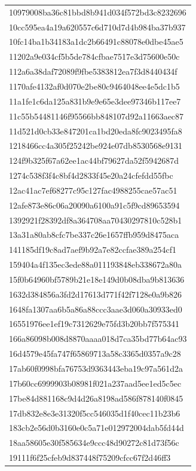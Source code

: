 \begin{tabular}{l}
10979008ba36c81bbd8b941d034f572bd3c8232696 \\
10cc595ea4a19a620557c6d710d7d4b984ba37b937 \\
10fc14ba1b34183a1dc2b66491c88078e0dbe45ae5 \\
11202a9e034cf5b5de784cfbae7517e3d75600e50c \\
112a6a38daf72089f9fbe5383812ea7f3d8440434f \\
1170afe4132af0d070e2be80c9464048ee4e5dc1b5 \\
11a1fe1c6da125a831b9e9e65e3dee97346b117ee7 \\
11c55b54481146f95566bb848107d92a11663aec87 \\
11d521d0cb33e847201ca1bd20eda8fc9023495fa8 \\
1218466cc4a305f25242be924e07db8530568e9131 \\
124f9b325f67a62ee1ac44bf79627da52f5942687d \\
1274c538f3f4c8bf4d2833f45e20a24cfefdd55fbc \\
12ac41ac7ef68277c95c127fac4988255cae57ac51 \\
12afe873e86c06a20090a6100a91c5f9cd89653594 \\
1392921f28392df8a364708aa70430297810c528b1 \\
13a31a80ab8cfc7be337c26e1657ffb959d8475aca \\
141185df19c8ad7aef9b92a7e82ccfae389a254cf1 \\
159404a4f135ec3ede88a011193848eb338672a80a \\
15f0b64960bf5789b21e18e149d0b08dba9b813636 \\
1632d384856a3fd2d17613d771f42f7128e0a9b826 \\
1648fa1307aa6b5a86a88ccc3aae3d060a30933ed0 \\
16551976ee1ef19c7312629e75fd3b20bb7f575341 \\
166a86098b008d8870aaaa018d7ca35bd77b64ac93 \\
16d4579e45fa747f65869713a58c3365d0357a9c28 \\
17ab60f0998bfa76753d9363443eba19c97a561d2a \\
17b60cc6999903b08981f021a237aad5ee1ed5c5ec \\
17be84d881168c9d4d26a8198ad586f878140f0845 \\
17db832e8e3e31320f5cc546035d1f40cec11b23b6 \\
183cb2e56d0b3160e0c5a71e012972004dab5fd44d \\
18aa58605e30f585634e9ccc48d90272c81d73f56c \\
19111f6f25cfeb9d837448f75209cfcc67f2d46ff3 \\

\end{tabular}
